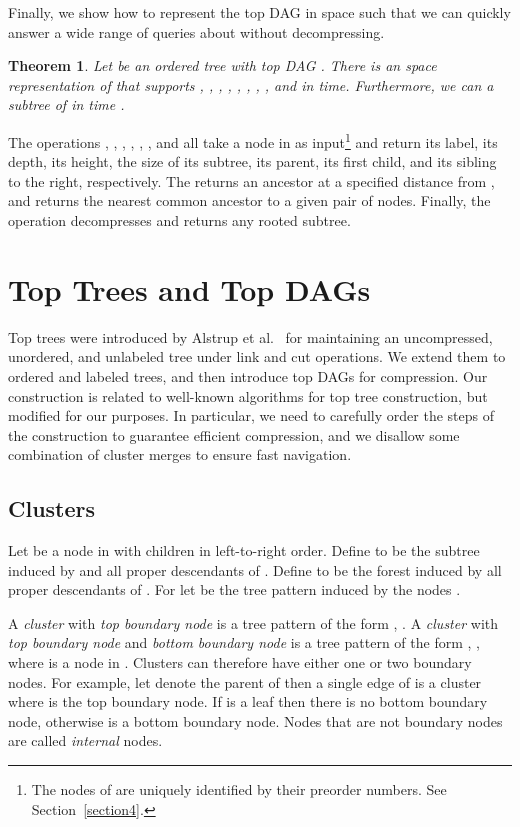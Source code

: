\documentclass [11pt]{article}
\newtheorem{theorem}{Theorem}
\begin{document}
Finally, we show how to represent the top DAG  in  space such that we can quickly answer a wide range of queries about  without decompressing. 
\begin{theorem}\label{thm:navigation}
Let  be an ordered tree with top DAG . There is an  space representation of  that supports , , , , , , , , and  in  time. Furthermore, we can   a subtree  of  in time . 
\end{theorem}
The operations , , , , , , and  all take a node  in  as input\footnote{The nodes of  are uniquely identified by their preorder numbers. See Section~\ref{section4}.} and return its label, its depth, its height, the size of its subtree, its parent, its first child, and its sibling to the right, respectively. The  returns an ancestor at a specified distance from , and  returns the nearest common ancestor to a given pair of nodes. Finally, the  operation decompresses and returns any rooted subtree. 

\section{Top Trees and Top DAGs}

Top trees were introduced by Alstrup et al.~\cite{AHLT1997,AHT2000,TopTrees} for maintaining an uncompressed, unordered, and unlabeled tree under link and cut operations. We extend them to ordered and labeled trees, and then introduce top DAGs for compression. Our construction is related to well-known algorithms for top tree construction, but modified for our purposes. In particular, we need to carefully order the steps of the construction to guarantee efficient compression, and we disallow some combination of cluster merges to ensure fast navigation. 

\subsection{Clusters} 
Let  be a node in  with children  in left-to-right order. Define  to be the subtree induced by  and all proper descendants of . Define  to be the forest induced by all proper descendants of . For  let  be the  tree pattern induced by the nodes .

A {\em cluster} with {\em top boundary node}  is a tree pattern of the form , . A {\em cluster} with {\em top boundary node}  and {\em bottom boundary node}  is a tree pattern of the form , , where  is a node in .
Clusters can therefore have either one or two boundary nodes. For example, let  denote the parent of  then a single edge 
  of  is a cluster where  is the top boundary node. If  is a leaf then there is no bottom boundary node, otherwise  is a bottom boundary node. Nodes that are not boundary nodes are called 
\emph{internal} nodes. 
\end{document}
